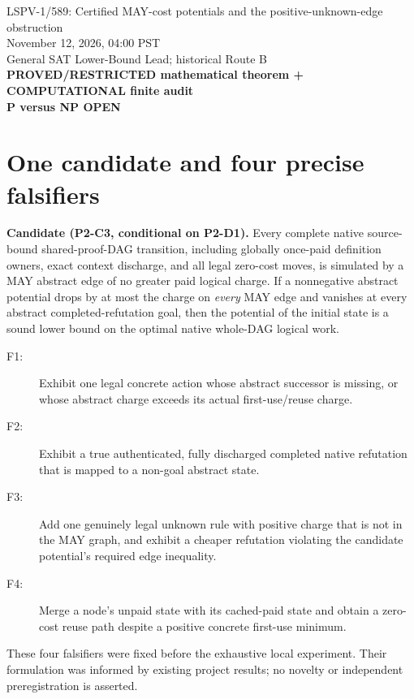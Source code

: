 \documentclass[11pt]{article}
\begin{document}
\begin{center}
{\Large LSPV-1/589: Certified MAY-cost potentials and the positive-unknown-edge obstruction}\\[5pt]
November 12, 2026, 04:00 PST\\
General SAT Lower-Bound Lead; historical Route B\\
\textbf{PROVED/RESTRICTED mathematical theorem + COMPUTATIONAL finite audit}\\
\textbf{P versus NP OPEN}
\end{center}

\section*{One candidate and four precise falsifiers}
\noindent\textbf{Candidate (P2-C3, conditional on P2-D1).}
Every complete native source-bound shared-proof-DAG transition, including globally once-paid
definition owners, exact context discharge, and all legal zero-cost moves, is simulated by
a MAY abstract edge of no greater paid logical charge. If a nonnegative abstract
potential drops by at most the charge on \emph{every} MAY edge and vanishes at
every abstract completed-refutation goal, then the potential of the initial state
is a sound lower bound on the optimal native whole-DAG logical work.

\begin{description}
\item[F1:] Exhibit one legal concrete action whose abstract successor is missing, or
whose abstract charge exceeds its actual first-use/reuse charge.
\item[F2:] Exhibit a true authenticated, fully discharged completed native
refutation that is mapped to a non-goal abstract state.
\item[F3:] Add one genuinely legal unknown rule with positive charge that is
not in the MAY graph, and exhibit a cheaper refutation violating the candidate
potential's required edge inequality.
\item[F4:] Merge a node's unpaid state with its cached-paid state and obtain a
zero-cost reuse path despite a positive concrete first-use minimum.
\end{description}
These four falsifiers were fixed before the exhaustive local experiment. Their
formulation was informed by existing project results; no novelty or
independent preregistration is asserted.
\end{document}
